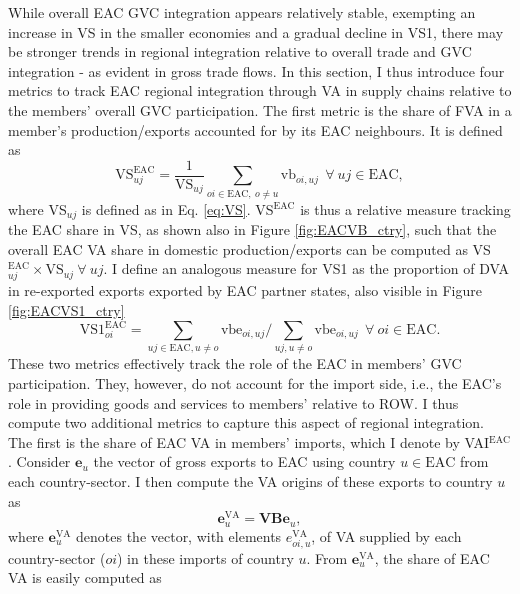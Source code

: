 \documentclass[a4paper]{article}
\begin{document}
While overall EAC GVC integration appears relatively stable, exempting an increase in VS in the smaller economies and a gradual decline in VS1, there may be stronger trends in regional integration relative to overall trade and GVC integration - as evident in gross trade flows. In this section, I thus introduce four metrics to track EAC regional integration through VA in supply chains relative to the members' overall GVC participation. The first metric is the share of FVA in a member's production/exports accounted for by its EAC neighbours. It is defined as 
%
\begin{equation} \label{eq:VS_EAC}
\text{VS}_{uj}^\text{EAC} = \frac{1}{\text{VS}_{uj}}  \sum_{oi \in \text{EAC},\ o \neq  u} \text{vb}_{oi, uj}   \ \ \forall\ uj \in \text{EAC},
\end{equation} 
%
\noindent where VS$_{uj}$ is defined as in Eq. \ref{eq:VS}. VS$^\text{EAC}$ is thus a relative measure tracking the EAC share in VS, as shown also in Figure \ref{fig:EACVB_ctry}, such that the overall EAC VA share in domestic production/exports can be computed as VS$_{uj}^\text{EAC} \times \text{VS}_{uj} \ \forall\ uj$. I define an analogous measure for VS1 as the proportion of DVA in re-exported exports exported by EAC partner states, also visible in Figure \ref{fig:EACVS1_ctry}
%
\begin{equation} \label{eq:VS1_EAC}
\text{VS1}_{oi}^\text{EAC} =  \sum_{uj \in \text{EAC}, u \neq  o} \text{vbe}_{oi, uj} \bigg/ \sum_{uj, u \neq  o} \text{vbe}_{oi, uj}\ \ \forall\ oi \in \text{EAC}.
\end{equation}
%
These two metrics effectively track the role of the EAC in members' GVC participation. They, however, do not account for the import side, i.e., the EAC's role in providing goods and services to members' relative to ROW. I thus compute two additional metrics to capture this aspect of regional integration. The first is the share of EAC VA in members' imports, which I denote by VAI$^\text{EAC}$. Consider $\textbf{e}_u$ the vector of gross exports to EAC using country $u \in \text{EAC}$ from each country-sector. I then compute the VA origins of these exports to country $u$ as 
%
\begin{equation}
\textbf{e}_u^\text{VA} = \textbf{VBe}_u,
\end{equation}
%
\noindent where $\textbf{e}_u^\text{VA}$ denotes the vector, with elements $e_{oi, u}^\text{VA}$, of VA supplied by each country-sector ($oi$) in these imports of country $u$. From  $\textbf{e}_u^\text{VA}$, the share of EAC VA is easily computed as 
\end{document}
